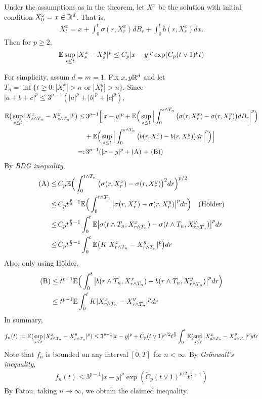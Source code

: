 \documentclass[10pt,a4paper]{article}
\newenvironment{proof}
{\begin{changemargin}{0.5cm}{0.5cm} 
	}%
	{\end{changemargin}
}
\newenvironment{p}
{\begin{proof} 
	}%
	{\end{proof}
}
\begin{document}
\prop Under the assumptions as in the theorem, let $X^x$ be the solution with initial condition $X_0^x =x \in \mathbb{R}^d$. That is,
\begin{align*}
X_t^x = x+ \int_0^t \sigma(r, X_r^x) dB_r + \int_0^t b(r, X_r^x) dx.
\end{align*}
Then for $p\geq 2$,
\begin{align*}
\mathbb{E} \sup_{s\leq t} |X_s^x - X_s^y|^p \leq C_p |x-y|^p \exp (C_p (t\vee 1)^p t)
\end{align*}
\begin{p}
\pf For simplicity, assum $d=m=1$. Fix $x, y\mathbb{R}^d$ and let $T_n =\inf \{t\geq 0 : |X_t^x|>n \text{ or } |X_t^y| >n \}$. Since $|a+b+c|^p \leq 3^{p-1}(|a|^p + |b|^p + |c|^p)$,
\begin{align*}
\mathbb{E} \big( \sup_{s\leq t} |X^x_{s\wedge T_n} -  X^y_{s\wedge T_n}|^p  \big) \leq & \,3^{p-1} \Big[ |x-y|^p + \mathbb{E} \Big( \sup_{s\leq t} \Big| \int_0^{s\wedge T_n} \big( \sigma(r, X_r^x) - \sigma(r, X_r^y)\big) dB_r \Big|^p \Big) \\
& + \mathbb{E} \Big( \sup_{s\leq t} \Big| \int_0^{s\wedge T_n} \big( b(r, X_r^x) - b(r, X_r^y)\big) dr \Big|^p \Big) \Big] \\
=: & \, 3^{p-1}( |x-y|^p + \text{(A) + (B)} )
\end{align*}
By \emph{BDG inequality},
\begin{align*}
\text{(A)} \leq &\, C_p \mathbb{E} \Big( \int_0^{t\wedge T_n} \big( \sigma(r, X_r^x) - \sigma(r, X_r^y) \big)^2 dr \Big)^{p/2} \\
\leq &\, C_p t^{\frac{p}{2} -1} \mathbb{E} \Big( \int_0^{t\wedge T_n} \big| \sigma(r, X_r^x) - \sigma(r, X_r^y) \big|^p dr \Big) \quad \text{(H\"older)} \\
\leq &\, C_p t^{\frac{p}{2} - 1} \int_0^t \mathbb{E} \big| \sigma(t \wedge T_n, X_{r\wedge T_n}^x) -\sigma(t \wedge T_n, X_{r\wedge T_n}^y) \big|^p dr \\
\leq &\, C_p t^{\frac{p}{2} - 1} \int_0^t \mathbb{E} \big( K |X^x_{r\wedge T_n} - X^y_{r\wedge T_n}|^p \big) dr
\end{align*}
Also, only using H\"older,
\begin{align*}
\text{(B)} & \leq t^{p-1} \mathbb{E} \Big(\int_0^t \big| b(r\wedge T_n, X^x_{r\wedge T_n}) - b(r\wedge T_n, X^y_{r\wedge T_n})\big|^p dr \Big) \\
& \leq t^{p-1} \mathbb{E} \int_0^t K |X^x_{r\wedge T_n} - X^y_{r\wedge T_n}|^p dr
\end{align*}
In summary,
\begin{align*}
f_n(t) := \mathbb{E} (\sup_{s\leq t} |X^x_{s\wedge T_n} - X^y_{s\wedge T_n}|^p ) \leq 3^{p-1} |x-y|^p + \tilde{C}_p (t\vee 1)^{p/2} t^{\frac{p}{2}} \int_0^t \mathbb{E} (\sup_{s\leq t} |X^x_{s\wedge T_n} - X^y_{s\wedge T_n}|^p) dr
\end{align*}
Note that $f_n$ is bounded on any interval $[0, T]$ for $n< \infty$. By \emph{Gr\"onwall's inequality}, 
\begin{align*}
f_n(t) \leq 3^{p-1} |x-y|^p \exp (\tilde{C}_p (t\vee 1)^{p/2} t^{\frac{p}{2}+1})
\end{align*}
By Fatou, taking $n\rightarrow \infty$, we obtain the claimed inequality. 

\eop
\end{p}
\s
\end{document}

